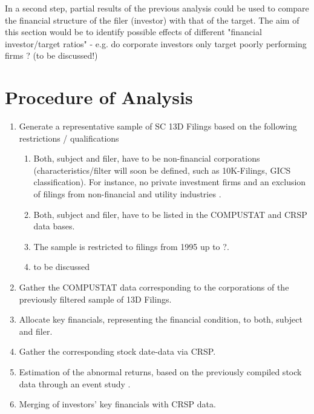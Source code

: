 \documentclass[12pt]{article}
\begin{document}
In a second step, partial results of the previous analysis could be used to compare the financial structure of the filer (investor) with that of the target. The aim of this section would be to identify possible effects of different "financial investor/target ratios" - e.g. do corporate investors only target poorly performing firms \citep{Klein2009}? (to be discussed!)

\section{Procedure of Analysis}

\begin{enumerate}
\item Generate a representative sample of SC 13D Filings based on the following restrictions / qualifications
	
	\begin{enumerate}
	\item Both, subject and filer, have to be non-financial corporations (characteristics/filter will soon be defined, such as 10K-Filings, GICS classification). For instance, no private investment firms and an exclusion of filings from non-financial and utility industries \citep{Brigida2012}.
 	\item Both, subject and filer, have to be listed in the COMPUSTAT and CRSP data bases.
	\item The sample is restricted to filings from 1995 up to ?.
	\item to be discussed
	\end{enumerate}
	
\item Gather the COMPUSTAT data corresponding to the corporations of the previously filtered sample of 13D Filings.
\item Allocate key financials, representing the financial condition, to both, subject and filer.
\item Gather the corresponding stock date-data via CRSP.
\item Estimation of the abnormal returns, based on the previously compiled stock data through an event study \citep{ang2011} \citep{Fama1992} \citep{Kolari2010}. 
\item Merging of investors' key financials with CRSP data.

\end{enumerate}

\pagebreak
\printbibliography[title=Relevant Literature (so far)]
\end{document}
